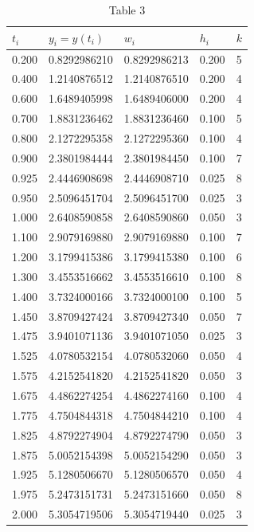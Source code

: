 \begin{table}[h]
\centering
\begin{tabular}{|l|l|l|l|l|}
\hline
$t_{i}$ & $y_{i}=y\left(t_{i}\right)$ & $w_{i}$ & $h_{i}$ & $k$ \\
\hline
0.200 & 0.8292986210 & 0.8292986213 & 0.200 & 5 \\
\hline
0.400 & 1.2140876512 & 1.2140876510 & 0.200 & 4 \\
\hline
0.600 & 1.6489405998 & 1.6489406000 & 0.200 & 4 \\
\hline
0.700 & 1.8831236462 & 1.8831236460 & 0.100 & 5 \\
\hline
0.800 & 2.1272295358 & 2.1272295360 & 0.100 & 4 \\
\hline
0.900 & 2.3801984444 & 2.3801984450 & 0.100 & 7 \\
\hline
0.925 & 2.4446908698 & 2.4446908710 & 0.025 & 8 \\
\hline
0.950 & 2.5096451704 & 2.5096451700 & 0.025 & 3 \\
\hline
1.000 & 2.6408590858 & 2.6408590860 & 0.050 & 3 \\
\hline
1.100 & 2.9079169880 & 2.9079169880 & 0.100 & 7 \\
\hline
1.200 & 3.1799415386 & 3.1799415380 & 0.100 & 6 \\
\hline
1.300 & 3.4553516662 & 3.4553516610 & 0.100 & 8 \\
\hline
1.400 & 3.7324000166 & 3.7324000100 & 0.100 & 5 \\
\hline
1.450 & 3.8709427424 & 3.8709427340 & 0.050 & 7 \\
\hline
1.475 & 3.9401071136 & 3.9401071050 & 0.025 & 3 \\
\hline
1.525 & 4.0780532154 & 4.0780532060 & 0.050 & 4 \\
\hline
1.575 & 4.2152541820 & 4.2152541820 & 0.050 & 3 \\
\hline
1.675 & 4.4862274254 & 4.4862274160 & 0.100 & 4 \\
\hline
1.775 & 4.7504844318 & 4.7504844210 & 0.100 & 4 \\
\hline
1.825 & 4.8792274904 & 4.8792274790 & 0.050 & 3 \\
\hline
1.875 & 5.0052154398 & 5.0052154290 & 0.050 & 3 \\
\hline
1.925 & 5.1280506670 & 5.1280506570 & 0.050 & 4 \\
\hline
1.975 & 5.2473151731 & 5.2473151660 & 0.050 & 8 \\
\hline
2.000 & 5.3054719506 & 5.3054719440 & 0.025 & 3 \\
\hline
\end{tabular}
\caption{\scriptsize Table $3$}
\label{tab:extrapolmethtab3}
\end{table}
%

